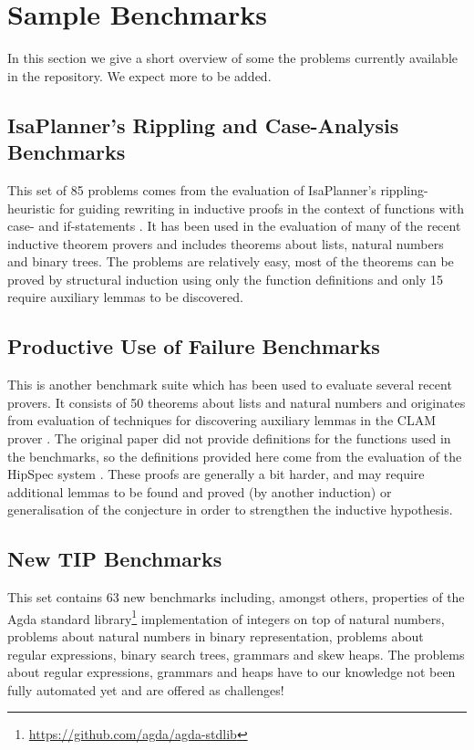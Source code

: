\documentclass{llncs}
\begin{document}
\section{Sample Benchmarks}
In this section we give a short overview of  some the problems currently available in the repository. We expect more to be added.

\subsection{IsaPlanner's Rippling and Case-Analysis Benchmarks}
\label{sec:isap}
This set of 85 problems comes from the evaluation of IsaPlanner's rippling-heuristic for guiding rewriting in inductive proofs in the context of functions with case- and if-statements \cite{IsaPcase}. It has been used in the evaluation of many of the recent inductive theorem provers and includes theorems about lists, natural numbers and binary trees. The problems are relatively easy, most of the theorems can be proved by structural induction using only the function definitions and only 15 require auxiliary lemmas to be discovered.

\subsection{Productive Use of Failure Benchmarks}
This is another benchmark suite which has been used to evaluate several recent provers. It consists of 50 theorems about lists and natural numbers and originates from evaluation of techniques for discovering auxiliary lemmas in the CLAM prover \cite{productiveuse}. The original paper did not provide definitions for the functions used in the benchmarks, so the definitions provided here come from the evaluation of the HipSpec system \cite{hipspecCADE}. These proofs are generally a bit harder, and may require additional lemmas to be found and proved (by another induction) or generalisation of the conjecture in order to strengthen the inductive hypothesis.

\subsection{New TIP Benchmarks}
This set contains 63 new benchmarks including, amongst others,
properties of the Agda standard
library\footnote{\url{https://github.com/agda/agda-stdlib}}
implementation of integers on top of natural numbers, problems about natural numbers in binary representation, problems about regular expressions, binary search trees, grammars and skew heaps. The problems about regular expressions, grammars and heaps have to our knowledge not been fully automated yet and are offered as challenges!
\end{document}
